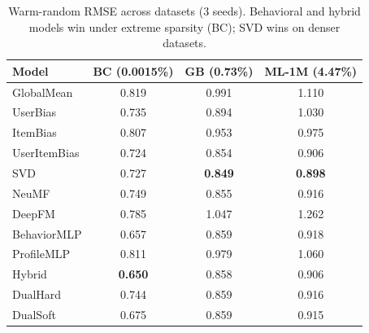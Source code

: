 \documentclass[journal]{IEEEtran}
\begin{document}
\begin{table}[!t]
\centering
\caption{Warm-random RMSE across datasets (3 seeds). Behavioral and hybrid models win under extreme sparsity (BC); SVD wins on denser datasets.}
\label{tab:sparsity}
\footnotesize
\begin{tabular}{@{}lccc@{}}
\toprule
Model & {BC (0.0015\%)} & {GB (0.73\%)} & {ML-1M (4.47\%)} \\
\midrule
GlobalMean    & 0.819 & 0.991 & 1.110 \\
UserBias      & 0.735 & 0.894 & 1.030 \\
ItemBias      & 0.807 & 0.953 & 0.975 \\
UserItemBias  & 0.724 & 0.854 & 0.906 \\
SVD           & 0.727 & \textbf{0.849} & \textbf{0.898} \\
NeuMF         & 0.749 & 0.855 & 0.916 \\
DeepFM        & 0.785 & 1.047 & 1.262 \\
BehaviorMLP   & 0.657 & 0.859 & 0.918 \\
ProfileMLP    & 0.811 & 0.979 & 1.060 \\
Hybrid        & \textbf{0.650} & 0.858 & 0.906 \\
DualHard      & 0.744 & 0.859 & 0.916 \\
DualSoft      & 0.675 & 0.859 & 0.915 \\
\bottomrule
\end{tabular}
\end{table}
\end{document}
